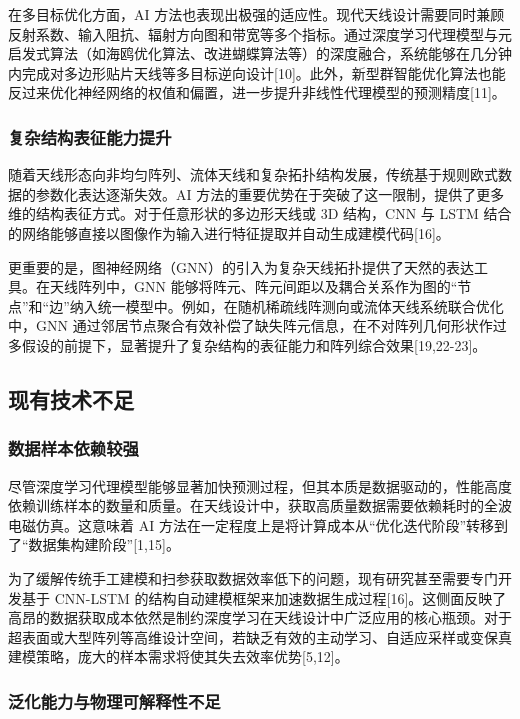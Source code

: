 \documentclass[UTF8,a4paper,12pt]{ctexart}
\begin{document}
在多目标优化方面，AI 方法也表现出极强的适应性。现代天线设计需要同时兼顾反射系数、输入阻抗、辐射方向图和带宽等多个指标。通过深度学习代理模型与元启发式算法（如海鸥优化算法、改进蝴蝶算法等）的深度融合，系统能够在几分钟内完成对多边形贴片天线等多目标逆向设计[10]。此外，新型群智能优化算法也能反过来优化神经网络的权值和偏置，进一步提升非线性代理模型的预测精度[11]。

\subsubsection{复杂结构表征能力提升}

随着天线形态向非均匀阵列、流体天线和复杂拓扑结构发展，传统基于规则欧式数据的参数化表达逐渐失效。AI 方法的重要优势在于突破了这一限制，提供了更多维的结构表征方式。对于任意形状的多边形天线或 3D 结构，CNN 与 LSTM 结合的网络能够直接以图像作为输入进行特征提取并自动生成建模代码[16]。

更重要的是，图神经网络（GNN）的引入为复杂天线拓扑提供了天然的表达工具。在天线阵列中，GNN 能够将阵元、阵元间距以及耦合关系作为图的“节点”和“边”纳入统一模型中。例如，在随机稀疏线阵测向或流体天线系统联合优化中，GNN 通过邻居节点聚合有效补偿了缺失阵元信息，在不对阵列几何形状作过多假设的前提下，显著提升了复杂结构的表征能力和阵列综合效果[19,22-23]。

\subsection{现有技术不足}

\subsubsection{数据样本依赖较强}

尽管深度学习代理模型能够显著加快预测过程，但其本质是数据驱动的，性能高度依赖训练样本的数量和质量。在天线设计中，获取高质量数据需要依赖耗时的全波电磁仿真。这意味着 AI 方法在一定程度上是将计算成本从“优化迭代阶段”转移到了“数据集构建阶段”[1,15]。

为了缓解传统手工建模和扫参获取数据效率低下的问题，现有研究甚至需要专门开发基于 CNN-LSTM 的结构自动建模框架来加速数据生成过程[16]。这侧面反映了高昂的数据获取成本依然是制约深度学习在天线设计中广泛应用的核心瓶颈。对于超表面或大型阵列等高维设计空间，若缺乏有效的主动学习、自适应采样或变保真建模策略，庞大的样本需求将使其失去效率优势[5,12]。

\subsubsection{泛化能力与物理可解释性不足}
\end{document}
